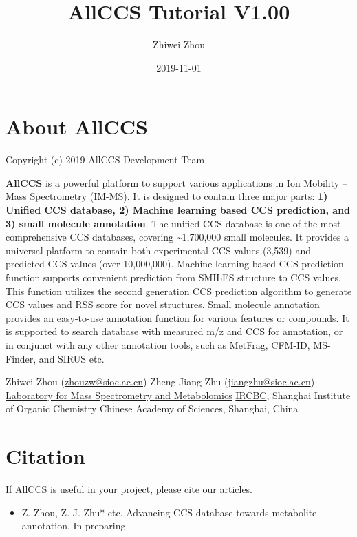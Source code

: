 \documentclass[12pt,]{book}
\title{AllCCS Tutorial V1.00}
\author{Zhiwei Zhou}
\date{2019-11-01}
\providecommand{\tightlist}{%
  \setlength{\itemsep}{0pt}\setlength{\parskip}{0pt}}
\begin{document}
\maketitle

{
\hypersetup{linkcolor=black}
\setcounter{tocdepth}{1}
\tableofcontents
}
\listoftables
\listoffigures
\chapter*{About AllCCS}\label{about-allccs}

Copyright (c) 2019 AllCCS Development Team

\href{http://allccs.zhulab.cn/}{\textbf{AllCCS}} is a powerful platform
to support various applications in Ion Mobility -- Mass Spectrometry
(IM-MS). It is designed to contain three major parts: \textbf{1) Unified
CCS database, 2) Machine learning based CCS prediction, and 3) small
molecule annotation}. The unified CCS database is one of the most
comprehensive CCS databases, covering \textasciitilde{}1,700,000 small
molecules. It provides a universal platform to contain both experimental
CCS values (3,539) and predicted CCS values (over 10,000,000). Machine
learning based CCS prediction function supports convenient prediction
from SMILES structure to CCS values. This function utilizes the second
generation CCS prediction algorithm to generate CCS values and RSS score
for novel structures. Small molecule annotation provides an easy-to-use
annotation function for various features or compounds. It is supported
to search database with measured m/z and CCS for annotation, or in
conjunct with any other annotation tools, such as MetFrag, CFM-ID,
MS-Finder, and SIRUS etc.

Zhiwei Zhou (\url{zhouzw@sioc.ac.cn}) Zheng-Jiang Zhu
(\url{jiangzhu@sioc.ac.cn}) \href{http://www.zhulab.cn/}{Laboratory for
Mass Spectrometry and Metabolomics}
\href{http://www.ircbc.ac.cn/}{IRCBC}, Shanghai Institute of Organic
Chemistry Chinese Academy of Sciences, Shanghai, China

\chapter*{Citation}\label{citation}

If AllCCS is useful in your project, please cite our articles.

\begin{itemize}
\tightlist
\item
  Z. Zhou, Z.-J. Zhu* etc. Advancing CCS database towards metabolite
  annotation, In preparing
\end{itemize}
\end{document}
